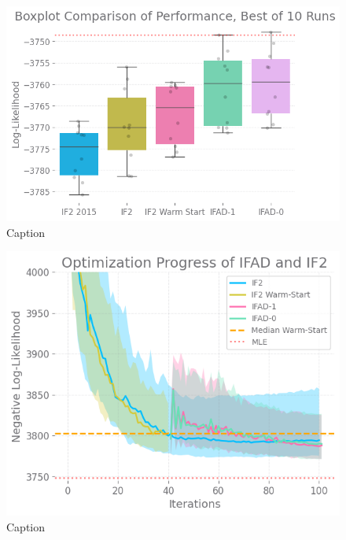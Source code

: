 \documentclass{article}
\begin{document}
\begin{figure}[h]
    \centering
    \includegraphics[scale=0.7]{imgs/095/boxplot.png}
    \caption{Caption}
    \label{fig:enter-label}
\end{figure}


\begin{figure}[h]
    \centering
    \includegraphics[scale=0.7]{imgs/095/optim.png}
    \caption{Caption}
    \label{fig:enter-label}
\end{figure}
\end{document}
